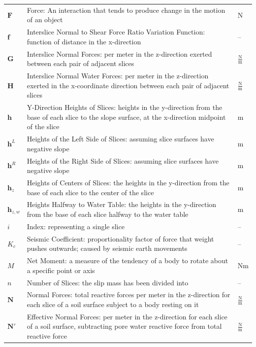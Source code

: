 \documentclass[12pt]{article}
\begin{document}
\begin{longtabu}{l X[l] l}
\\
$\mathbf{F}$ & Force: An interaction that tends to produce change in the motion of an object & N
\\
$\mathbf{f}$ & Interslice Normal to Shear Force Ratio Variation Function: function of distance in the x-direction & --
\\
$\mathbf{G}$ & Interslice Normal Forces: per meter in the z-direction exerted between each pair of adjacent slices & $\frac{\text{N}}{\text{m}}$
\\
$\mathbf{H}$ & Interslice Normal Water Forces: per meter in the z-direction exerted in the x-coordinate direction between each pair of adjacent slices & $\frac{\text{N}}{\text{m}}$
\\
$\mathbf{h}$ & Y-Direction Heights of Slices: heights in the y-direction from the base of each slice to the slope surface, at the x-direction midpoint of the slice & m
\\
${\mathbf{h}^{L}}$ & Heights of the Left Side of Slices: assuming slice surfaces have negative slope & m
\\
${\mathbf{h}^{R}}$ & Heights of the Right Side of Slices: assuming slice surfaces have negative slope & m
\\
${\mathbf{h}_{z}}$ & Heights of Centers of Slices: the heights in the y-direction from the base of each slice to the center of the slice & m
\\
${\mathbf{h}_{z,w}}$ & Heights Halfway to Water Table: the heights in the y-direction from the base of each slice halfway to the water table & m
\\
$i$ & Index: representing a single slice & --
\\
${K_{c}}$ & Seismic Coefficient: proportionality factor of force that weight pushes outwards; caused by seismic earth movements & --
\\
$M$ & Net Moment: a measure of the tendency of a body to rotate about a specific point or axis & Nm
\\
$n$ & Number of Slices: the slip mass has been divided into & --
\\
$\mathbf{N}$ & Normal Forces: total reactive forces per meter in the z-direction for each slice of a soil surface subject to a body resting on it & $\frac{\text{N}}{\text{m}}$
\\
$\mathbf{N'}$ & Effective Normal Forces: per meter in the z-direction for each slice of a soil surface, subtracting pore water reactive force from total reactive force & $\frac{\text{N}}{\text{m}}$
\\

\end{longtabu}
\end{document}
